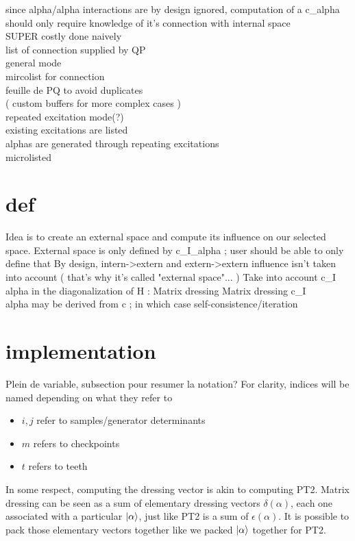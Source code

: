 \documentclass[./thesis.tex]{subfiles}
\begin{document}
since alpha/alpha interactions are by design ignored, computation of a c\_alpha should only require knowledge of it's connection with internal space \\
SUPER costly done naively \\
list of connection supplied by QP \\
general mode \\
mircolist for connection \\
feuille de PQ to avoid duplicates \\
( custom buffers for more complex cases ) \\
repeated excitation mode(?)  \\
existing excitations are listed \\
alphas are generated through repeating excitations \\

microlisted \\
\section{def}
Idea is to create an external space and compute its influence on our selected space.
External space is only defined by c\_I\_alpha ; user should be able to only define that
By design, intern->extern and extern->extern influence isn't taken into account ( that's why it's called "external space"... )
Take into account c\_I\\alpha in the diagonalization of H : Matrix dressing
Matrix dressing
c\_I\\alpha may be derived from c ; in which case self-consistence/iteration


\section{implementation}
Plein de variable, subsection pour resumer la notation?
For clarity, indices will be named depending on what they refer to
\begin{itemize}
\item
$i,j$ refer to samples/generator determinants
\item
$m$ refers to checkpoints
\item
$t$ refers to teeth
\end{itemize}

In some respect, computing the dressing vector is akin to computing PT2. Matrix dressing can be seen as a sum of elementary dressing vectors $\delta(\alpha)$, each one associated with a particular $\ket \alpha$, just like PT2 is a sum of $\epsilon(\alpha)$. It is possible to pack those elementary vectors together like we packed $\ket \alpha$ together for PT2.
\end{document}
